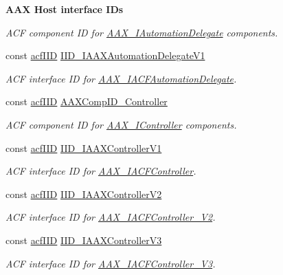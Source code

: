 \begin{Indent}{\bf A\+A\+X Host interface I\+Ds}
\begin{DoxyCompactItemize}
\begin{DoxyCompactList}\small\item\em A\+C\+F component I\+D for \hyperlink{a00086}{A\+A\+X\+\_\+\+I\+Automation\+Delegate} components. \end{DoxyCompactList}\item 
const \hyperlink{a00150_a59df0b41744eee7a066787aaedf97f67}{acf\+I\+I\+D} \hyperlink{a00299_ae771259726eee32ff16e1399e03e4457}{I\+I\+D\+\_\+\+I\+A\+A\+X\+Automation\+Delegate\+V1}
\begin{DoxyCompactList}\small\item\em A\+C\+F interface I\+D for \hyperlink{a00048}{A\+A\+X\+\_\+\+I\+A\+C\+F\+Automation\+Delegate}. \end{DoxyCompactList}\item 
const \hyperlink{a00150_a59df0b41744eee7a066787aaedf97f67}{acf\+I\+I\+D} \hyperlink{a00299_a5c927ea96aceac064ced592799c4070c}{A\+A\+X\+Comp\+I\+D\+\_\+\+Controller}
\begin{DoxyCompactList}\small\item\em A\+C\+F component I\+D for \hyperlink{a00090}{A\+A\+X\+\_\+\+I\+Controller} components. \end{DoxyCompactList}\item 
const \hyperlink{a00150_a59df0b41744eee7a066787aaedf97f67}{acf\+I\+I\+D} \hyperlink{a00299_ade31528710cfa399a89bf6bae7854fa0}{I\+I\+D\+\_\+\+I\+A\+A\+X\+Controller\+V1}
\begin{DoxyCompactList}\small\item\em A\+C\+F interface I\+D for \hyperlink{a00053}{A\+A\+X\+\_\+\+I\+A\+C\+F\+Controller}. \end{DoxyCompactList}\item 
const \hyperlink{a00150_a59df0b41744eee7a066787aaedf97f67}{acf\+I\+I\+D} \hyperlink{a00299_abf2eeeaec58a9de670e36a80507320f7}{I\+I\+D\+\_\+\+I\+A\+A\+X\+Controller\+V2}
\begin{DoxyCompactList}\small\item\em A\+C\+F interface I\+D for \hyperlink{a00054}{A\+A\+X\+\_\+\+I\+A\+C\+F\+Controller\+\_\+\+V2}. \end{DoxyCompactList}\item 
const \hyperlink{a00150_a59df0b41744eee7a066787aaedf97f67}{acf\+I\+I\+D} \hyperlink{a00299_ab493d5302acb8e87ac9ba19d0baa92d2}{I\+I\+D\+\_\+\+I\+A\+A\+X\+Controller\+V3}
\begin{DoxyCompactList}\small\item\em A\+C\+F interface I\+D for \hyperlink{a00055}{A\+A\+X\+\_\+\+I\+A\+C\+F\+Controller\+\_\+\+V3}. \end{DoxyCompactList}\item 

\end{DoxyCompactItemize}
\end{Indent}
